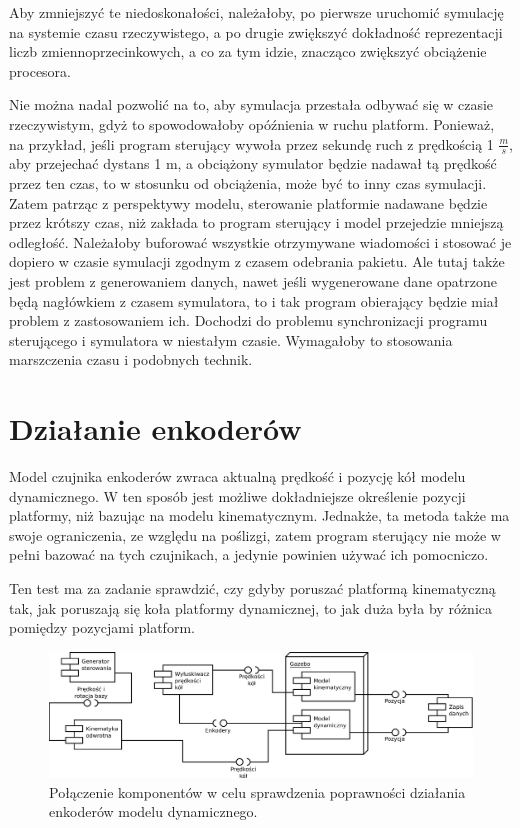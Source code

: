 		Aby zmniejszyć te niedoskonałości, należałoby, po pierwsze uruchomić symulację na systemie czasu rzeczywistego, a po drugie zwiększyć 
		dokładność reprezentacji liczb zmiennoprzecinkowych, a co za tym idzie, znacząco zwiększyć obciążenie procesora.
		
		Nie można nadal pozwolić na to, aby symulacja przestała odbywać się w czasie rzeczywistym, gdyż to spowodowałoby opóźnienia w ruchu platform.
		Ponieważ, na przykład, jeśli program sterujący wywoła przez sekundę ruch z prędkością 1 $\frac{m}{s}$, aby przejechać dystans 1 m,
		a obciążony symulator będzie nadawał tą prędkość przez ten czas, to w stosunku od obciążenia, może być to inny czas symulacji.
		Zatem patrząc z perspektywy modelu, sterowanie platformie nadawane będzie przez krótszy czas, niż zakłada to program sterujący i model przejedzie mniejszą odległość.
		Należałoby buforować wszystkie otrzymywane wiadomości i stosować je dopiero w czasie symulacji zgodnym z czasem odebrania pakietu. 
		Ale tutaj także jest problem z generowaniem danych, nawet jeśli wygenerowane dane opatrzone będą nagłówkiem z czasem symulatora, to i tak program obierający będzie miał
		problem z zastosowaniem ich. Dochodzi do problemu synchronizacji programu sterującego i symulatora w niestałym czasie. 
		Wymagałoby to stosowania marszczenia czasu i podobnych technik.
		
\section{Działanie enkoderów}
	Model czujnika enkoderów zwraca aktualną prędkość i pozycję kół modelu dynamicznego.
	W ten sposób jest możliwe dokładniejsze określenie pozycji platformy, niż bazując na modelu kinematycznym.
	Jednakże, ta metoda także ma swoje ograniczenia, ze względu na poślizgi, zatem program sterujący nie może w pełni bazować na tych czujnikach, a jedynie powinien używać ich pomocniczo.
	
	Ten test ma za zadanie sprawdzić, czy gdyby poruszać platformą kinematyczną tak, jak poruszają się koła platformy dynamicznej, to jak duża była by różnica pomiędzy 
	pozycjami platform.
	
	\begin{figure}[H]
		\centering
		\includegraphics[width=\textwidth]{uml/encoders.pdf}
			\caption{Połączenie komponentów w celu sprawdzenia poprawności działania enkoderów modelu dynamicznego.}
		\label{uml:encoders}
	\end{figure}
	

